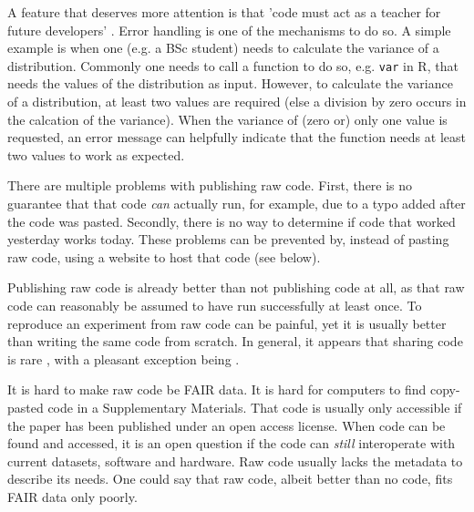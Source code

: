 A feature that deserves more attention
is that 'code must act as a teacher for future developers' \cite{sadowski2018modern}.
Error handling is one of the mechanisms to do so.
A simple example is when one (e.g. a BSc student) 
needs to calculate the variance of a distribution.
Commonly one needs to call a function to do so, 
e.g. \verb|var| in R, that needs the values of the distribution
as input.
However, to calculate the variance of a distribution, at least two values
are required (else a division by zero occurs in the calcation of the variance). 
When the variance of (zero or) only one value is requested,
an error message can helpfully indicate that the function 
needs at least two values to work as expected.


There are multiple problems with publishing raw code.
First, there is no guarantee that that code \emph{can} actually
run, for example, due to a typo added after the code was pasted.
Secondly, there is no way to determine if code that worked yesterday
works today. These problems can be prevented by, instead of
pasting raw code, using a website to host that code (see below).


Publishing raw code is already better than not publishing code at all,
as that raw code can reasonably be assumed to have run successfully at least once.
To reproduce an experiment from raw code can be painful, 
yet it is usually better than writing the same code from scratch.
In general, it appears that sharing code is 
rare \cite{stodden2011trust,read2015sizing},
with a pleasant exception being \cite{conesa2019making}.


It is hard to make raw code be FAIR data. It is hard for computers to find
copy-pasted code in a Supplementary Materials. 
That code is usually only accessible
if the paper has been published under an open access license.
When code can be found and accessed, it is an open question if the
code can \emph{still} interoperate with current datasets, software
and hardware. Raw code usually lacks the metadata to describe its needs.
One could say that raw code, albeit better than no code, fits
FAIR data only poorly.

